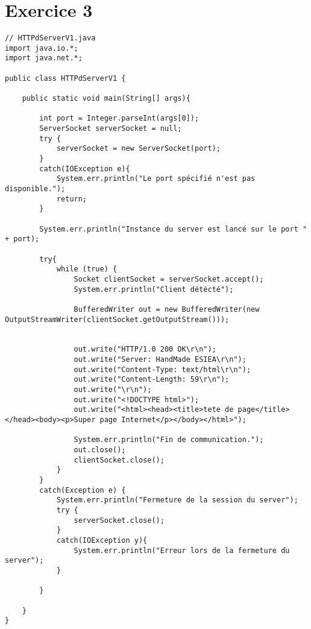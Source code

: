 \documentclass{article}
\begin{document}
\section*{Exercice 3}
\begin{lstlisting}
// HTTPdServerV1.java
import java.io.*;
import java.net.*;

public class HTTPdServerV1 {

    public static void main(String[] args){

        int port = Integer.parseInt(args[0]);
        ServerSocket serverSocket = null;
        try {
            serverSocket = new ServerSocket(port);
        }
        catch(IOException e){
            System.err.println("Le port spécifié n'est pas disponible.");
            return;
        }
        
        System.err.println("Instance du server est lancé sur le port " + port);
    
        try{
            while (true) {
                Socket clientSocket = serverSocket.accept();
                System.err.println("Client détécté");
        
                BufferedWriter out = new BufferedWriter(new OutputStreamWriter(clientSocket.getOutputStream()));
        

                out.write("HTTP/1.0 200 OK\r\n");
                out.write("Server: HandMade ESIEA\r\n");
                out.write("Content-Type: text/html\r\n");
                out.write("Content-Length: 59\r\n");
                out.write("\r\n");
                out.write("<!DOCTYPE html>");
                out.write("<html><head><title>tete de page</title></head><body><p>Super page Internet</p></body></html>");
        
                System.err.println("Fin de communication.");
                out.close();
                clientSocket.close();
            }
        }
        catch(Exception e) {
            System.err.println("Fermeture de la session du server");
            try {
                serverSocket.close();
            }
            catch(IOException y){
                System.err.println("Erreur lors de la fermeture du server");
            }
            
        }
        
    }
}
\end{lstlisting}
\end{document}
